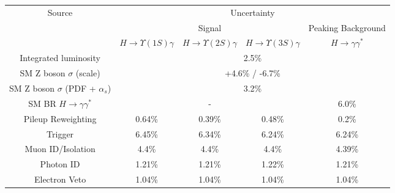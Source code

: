 

\begin{tabular}{c|c|c|c|c}
\cline{1-5}
\multirow{3}{*}{Source} & \multicolumn{4}{c}{Uncertainty} \\
\cline{2-5}
& \multicolumn{3}{c|}{Signal} & Peaking Background   \\
\cline{2-5}
& $H \rightarrow \Upsilon(1S)  \gamma$ & $H \rightarrow \Upsilon(2S)  \gamma$ & $H \rightarrow \Upsilon(3S)  \gamma$ & $H \rightarrow \gamma\gamma^{*}$  \\
\hline\hline
Integrated luminosity & \multicolumn{4}{c}{2.5\%} \\
\hline
SM Z boson $\sigma$ (scale) & \multicolumn{4}{c}{+4.6\% / -6.7\%}  \\
\hline
SM Z boson $\sigma$ (PDF + $\alpha_s$) & \multicolumn{4}{c}{3.2\%}  \\
\hline
SM BR $H \rightarrow \gamma\gamma^{*}$  & \multicolumn{3}{c|}{-}  & \multicolumn{1}{c}{6.0\%} \\
\hline
Pileup Reweighting & 0.64\% & 0.39\% & 0.48\% & 0.2\% \\
\hline
Trigger & 6.45\% & 6.34\% & 6.24\% & 6.24\% \\
\hline
Muon ID/Isolation & 4.4\% & 4.4\% & 4.4\% & 4.39\% \\
\hline
Photon ID  & 1.21\% & 1.21\% & 1.22\% & 1.21\% \\
\hline
Electron Veto & 1.04\% & 1.04\% & 1.04\% & 1.04\% \\
\hline
\end{tabular}
